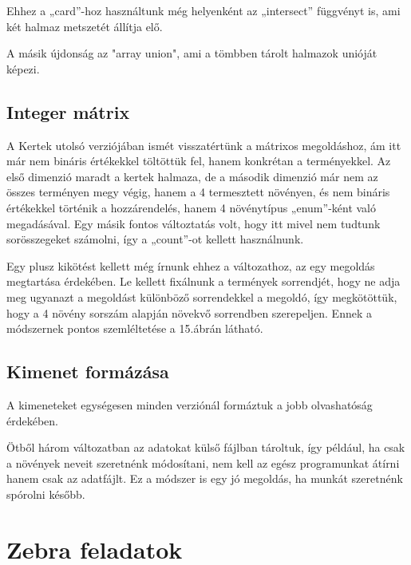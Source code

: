 \documentclass[12pt,a4paper,twoside, openright]{report}
\begin{document}

    Ehhez a „card”-hoz használtunk még helyenként az „intersect” függvényt is, ami két halmaz metszetét állítja elő.


    A másik újdonság az "array union", ami a tömbben tárolt halmazok unióját képezi.

\subsection{Integer mátrix}

    A Kertek utolsó verziójában ismét visszatértünk a mátrixos megoldáshoz, ám itt már nem bináris értékekkel töltöttük fel, hanem konkrétan a terményekkel.
    Az első dimenzió maradt a kertek halmaza, de a második dimenzió már nem az összes terményen megy végig, hanem a 4 termesztett növényen, és nem bináris értékekkel történik a hozzárendelés, hanem 4 növénytípus „enum”-ként való megadásával.
    Egy másik fontos változtatás volt, hogy itt mivel nem tudtunk sorösszegeket számolni, így a „count”-ot kellett használnunk.



    Egy plusz kikötést kellett még írnunk ehhez a változathoz, az egy megoldás megtartása érdekében.
    Le kellett fixálnunk a termények sorrendjét, hogy ne adja meg ugyanazt a megoldást különböző sorrendekkel a megoldó, így megkötöttük, hogy a 4 növény sorszám alapján növekvő sorrendben szerepeljen.
    Ennek a módszernek pontos szemléltetése a 15.ábrán látható.


\subsection{Kimenet formázása}

    A kimeneteket egységesen minden verziónál formáztuk a jobb olvashatóság érdekében.


    Ötből három változatban az adatokat külső fájlban tároltuk, így például, ha csak a növények neveit szeretnénk módosítani, nem kell az egész programunkat átírni hanem csak az adatfájlt.
    Ez a módszer is egy jó megoldás, ha munkát szeretnénk spórolni később.

\section{Zebra feladatok}
\end{document}
